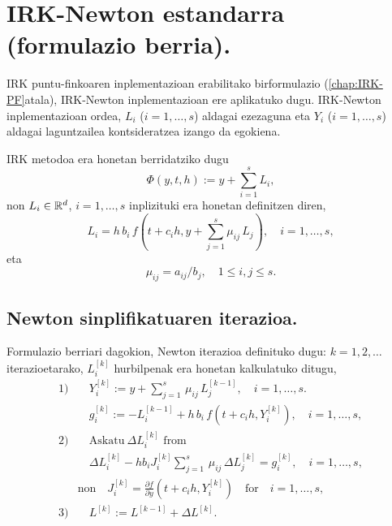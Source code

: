 \section{IRK-Newton estandarra (formulazio berria).}

IRK puntu-finkoaren inplementazioan erabilitako birformulazio (\ref{chap:IRK-PF}atala), IRK-Newton inplementazioan ere aplikatuko dugu. IRK-Newton inplementazioan ordea, $L_i$ ($i=1,\dots,s$) aldagai ezezaguna eta $Y_i$ ($i=1,\dots,s$) aldagai laguntzailea kontsideratzea \cite{Olsson2000} izango da egokiena.

IRK metodoa era honetan berridatziko dugu
\begin{equation}
\label{eq:PhiIRK2}
\Phi(y,t,h) :=y + \sum_{i=1}^s L_{i},
\end{equation}
%
non $L_{i} \in \mathbb{R}^d$, $i=1,\ldots,s$ inplizituki era honetan definitzen diren,
%
\begin{equation}
\label{eq:L}
 L_{i} = h \, b_i \, f(t+c_i h, y+ \sum_{j=1}^s \mu_{ij}\,L_{j}), \quad  i=1 ,\ldots, s, 
\end{equation}
%
eta
%
\begin{equation*} 
\mu_{ij}=a_{ij}/b_j,  \quad 1 \leq i,j \leq s.
\end{equation*}
%
\subsection*{Newton sinplifikatuaren iterazioa.}

Formulazio berriari dagokion, Newton iterazioa definituko dugu:  $k=1,2,\dots$ iterazioetarako, $L_i^{[k]}$ hurbilpenak era honetan kalkulatuko ditugu,
\begin{equation}
\label{eq:Newton_iteration2}
\begin{split}
1) 
   & \quad Y_i^{[k]} := y+\sum_{j=1}^{s}\, \mu_{ij}\, L_{j}^{[k-1]}, \quad  i=1 ,\ldots, s. \\
   & \quad g_i^{[k]} := -L_{i}^{[k-1]}  + h \, b_i\, f(t+c_i h,  Y_i^{[k]}), \quad  i=1 ,\ldots, s, \\   
2) & \quad \mathrm{Askatu \ } \Delta L_{i}^{[k]} \mbox{\  from \ } \\
   & \quad \Delta L_{i}^{[k]}  - h b_i J_i^{[k]} \sum_{j=1}^{s}\, \mu_{ij} \, \Delta L_{j}^{[k]}=g_i^{[k]}, \quad  i=1 ,\ldots, s,  \\
& \mbox{non} \quad  J_i^{[k]}=\frac{\partial f}{\partial y}(t + c_i h,Y_{i}^{[k]}) \quad	\mbox{for} \quad  i=1,\ldots, s,  \\
3) 
   & \quad   L^{[k]} := L^{[k-1]}  + \Delta L^{[k]}.
   \end{split}
\end{equation}

